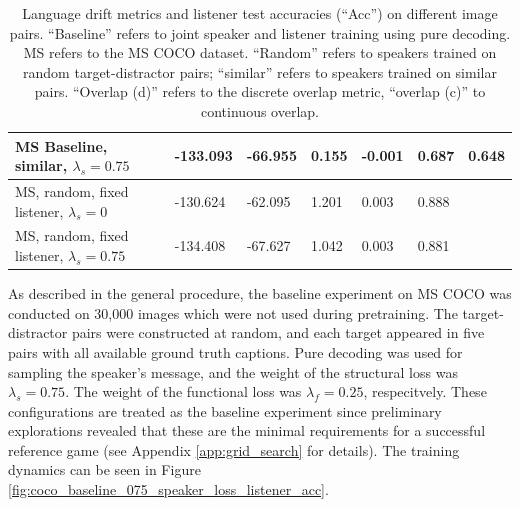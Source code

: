 \begin{table}[]
\begin{tabularx}{\textwidth}{|X|l|l|X|X|X|X|}
		MS Baseline, similar, $\lambda_s = 0.75$  &     -133.093              &       -66.955                &               0.155       &       -0.001               &      0.687             &                               0.648            \\ \hline
		MS, random, fixed listener, $\lambda_s = 0$  &         -130.624         &           -62.095             &     1.201                 &        0.003              &                          0.888                &                                           \\ \hline
		MS, random, fixed listener, $\lambda_s = 0.75$  &         -134.408          &           -67.627             &     1.042                 &        0.003              &                          0.881                &                                           \\ \hline
	\end{tabularx}
\caption{\label{tab:coco_drift_metrics_basic} Language drift metrics and listener test accuracies (``Acc'') on different image pairs. 
	``Baseline'' refers to joint speaker and listener training using pure decoding. MS refers to the MS COCO dataset. ``Random'' refers to speakers trained on random target-distractor pairs; ``similar'' refers to speakers trained on similar pairs. ``Overlap (d)'' refers to the discrete overlap metric, ``overlap (c)'' to continuous overlap.}
\end{table}

As described in the general procedure, the baseline experiment on MS COCO was conducted on 30,000 images which were not used during pretraining. The target-distractor pairs were constructed at random, and each target appeared in five pairs with all available ground truth captions. Pure decoding was used for sampling the speaker's message, and the weight of the structural loss was $\lambda_s = 0.75$. The weight of the functional loss was $\lambda_f = 0.25$, respecitvely. These configurations are treated as the baseline experiment since preliminary explorations revealed that these are the minimal requirements for a successful reference game (see Appendix \ref{app:grid_search} for details). The training dynamics can be seen in Figure \ref{fig:coco_baseline_075_speaker_loss_listener_acc}.

